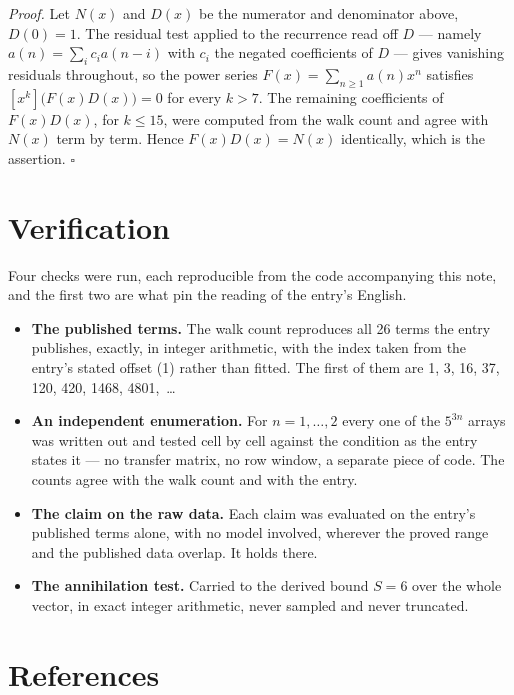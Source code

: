 \documentclass[11pt]{article}
\theoremstyle{definition}
\begin{document}
{\itshape Proof.} Let $N(x)$ and $D(x)$ be the numerator and denominator above, $D(0)=1$. The residual test applied to the recurrence read off $D$ --- namely $a(n) = \sum_i c_i a(n-i)$ with $c_i$ the negated coefficients of $D$ --- gives vanishing residuals throughout, so the power series $F(x)=\sum_{n\ge 1}a(n)x^n$ satisfies $[x^k]\bigl(F(x)D(x)\bigr) = 0$ for every $k > 7$. The remaining coefficients of $F(x)D(x)$, for $k \le 15$, were computed from the walk count and agree with $N(x)$ term by term. Hence $F(x)D(x) = N(x)$ identically, which is the assertion. $\square$

\section{Verification}

Four checks were run, each reproducible from the code accompanying this note, and the first two are what pin the reading of the entry's English.

\begin{itemize}

\item {\bfseries The published terms.} The walk count reproduces all 26 terms the entry publishes, exactly, in integer arithmetic, with the index taken from the entry's stated offset (1) rather than fitted. The first of them are 1, 3, 16, 37, 120, 420, 1468, 4801,~\dots

\item {\bfseries An independent enumeration.} For $n = 1,\dots,2$ every one of the $5^{3n}$ arrays was written out and tested cell by cell against the condition as the entry states it --- no transfer matrix, no row window, a separate piece of code. The counts agree with the walk count and with the entry.

\item {\bfseries The claim on the raw data.} Each claim was evaluated on the entry's published terms alone, with no model involved, wherever the proved range and the published data overlap. It holds there.

\item {\bfseries The annihilation test.} Carried to the derived bound $S = 6$ over the whole vector, in exact integer arithmetic, never sampled and never truncated.

\end{itemize}

\section{References}
\end{document}
